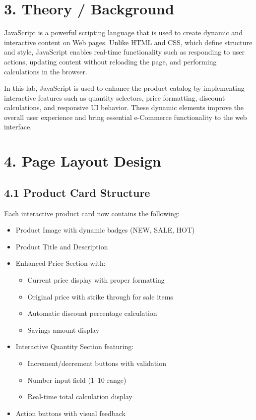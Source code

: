 \documentclass[a4paper,12pt]{article}
\begin{document}
\section*{3. Theory / Background}
JavaScript is a powerful scripting language that is used to create dynamic and interactive content on Web pages. Unlike HTML and CSS, which define structure and style, JavaScript enables real-time functionality such as responding to user actions, updating content without reloading the page, and performing calculations in the browser.

In this lab, JavaScript is used to enhance the product catalog by implementing interactive features such as quantity selectors, price formatting, discount calculations, and responsive UI behavior. These dynamic elements improve the overall user experience and bring essential e-Commerce functionality to the web interface.

\section*{4. Page Layout Design}
\subsection*{4.1 Product Card Structure}
Each interactive product card now contains the following:
\begin{itemize}
  \item Product Image with dynamic badges (NEW, SALE, HOT)
  \item Product Title and Description
  \item Enhanced Price Section with:
        \begin{itemize}
          \item Current price display with proper formatting
          \item Original price with strike through for sale items
          \item Automatic discount percentage calculation
          \item Savings amount display
        \end{itemize}
  \item Interactive Quantity Section featuring:
        \begin{itemize}
          \item Increment/decrement buttons with validation
          \item Number input field (1--10 range)
          \item Real-time total calculation display
        \end{itemize}
  \item Action buttons with visual feedback
\end{itemize}
\end{document}
